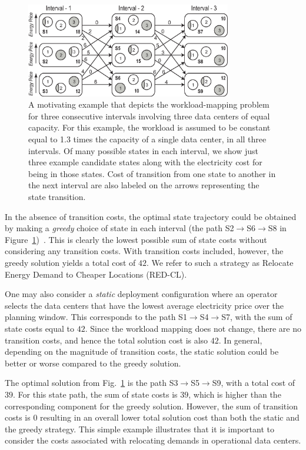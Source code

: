 \begin{figure}
\centering
\includegraphics[width=0.8\textwidth]{pics/ExampleTemplate3.eps}

\caption{A motivating example that depicts the workload-mapping
problem for three consecutive intervals involving three data
centers of equal capacity. For this example, the workload is
assumed to be constant equal to 1.3 times the capacity of a
single data center, in all three intervals. Of many possible
states in each interval, we show just three example candidate
states along with the electricity cost for being in those
states. Cost of transition from one state to another in the
next interval are also labeled on the arrows representing the
state transition.} \label{fig:mot-example}
\end{figure}

In the absence of transition costs, the optimal state
trajectory could be obtained by making a \emph{greedy} choice of state in
each
interval (the path S2$\rightarrow$S6$\rightarrow$S8 in Figure~\ref{fig:mot-example})~\cite{qureshiHotnets,qureshi2009cutting,rao2010}.
This is clearly the
lowest possible sum of state costs without considering any
transition costs.  
With transition costs included, however, the
greedy solution yields a total cost of $42$. We refer to such a strategy as Relocate Energy Demand to Cheaper
Locations (RED-CL). 

One may also consider a \emph{static} deployment configuration
where an operator selects the data centers that have the lowest
average electricity price over the planning window. This
corresponds to the path S1$\rightarrow$S4$\rightarrow$S7, with
the sum of state costs equal to $42$. Since the workload
mapping does not change, there are no transition costs, and
hence the total solution cost is also $42$. In general,
depending on the magnitude of transition costs, the static
solution could be better or worse compared to the greedy
solution.

The optimal solution from Fig.~\ref{fig:mot-example} is the
path S3$\rightarrow$S5$\rightarrow$S9, with a total cost of
$39$. For this state path, the sum of state costs is $39$,
which is higher than the corresponding component for the greedy
solution. However, the sum of transition costs is $0$ resulting
in an overall lower total solution cost than both the static and the 
greedy strategy. This simple example illustrates that it is
important to consider the costs associated with relocating
demands in operational data centers.

